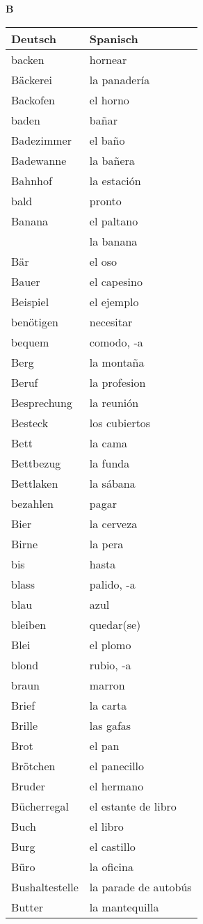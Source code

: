 \begin{flushright}\begin{Huge}\textbf{B}\end{Huge}\end{flushright}

\begin{longtable}{p{} p{}} 
\textbf{Deutsch}     & \textbf{Spanisch}                                       \\ \hline
\hline
\endhead %
backen & hornear\\
Bäckerei & la panadería\\
Backofen & el horno\\
baden & bañar\\
Badezimmer & el baño\\
Badewanne & la bañera\\
Bahnhof & la estación \\
bald & pronto\\
Banana & el paltano\\
~ & la banana\\
Bär & el oso\\
Bauer & el capesino \\
Beispiel & el ejemplo \\
benötigen & necesitar\\
bequem & comodo, -a\\
Berg & la montaña \\
Beruf & la profesion\\
Besprechung & la reunión\\
Besteck & los cubiertos\\
Bett & la cama \\
Bettbezug & la funda\\
Bettlaken & la sábana\\
bezahlen & pagar\\
Bier & la cerveza\\
Birne & la pera\\
bis & hasta \\
blass & palido, -a\\
blau & azul \\
bleiben & quedar(se)\\
Blei & el plomo \\
blond & rubio, -a\\
braun & marron \\
Brief & la carta\\
Brille & las gafas\\
Brot & el pan\\
Brötchen & el panecillo\\
Bruder & el hermano\\
Bücherregal & el estante de libro\\
Buch & el libro \\
Burg & el castillo\\
Büro & la oficina\\
Bushaltestelle & la parade de autobús\\
Butter & la mantequilla \\
\end{longtable}
